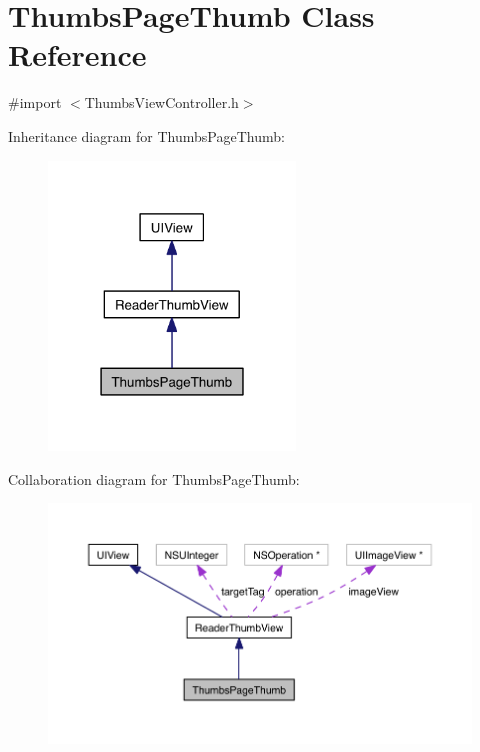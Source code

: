 \hypertarget{interface_thumbs_page_thumb}{\section{Thumbs\-Page\-Thumb Class Reference}
\label{d0/ddf/interface_thumbs_page_thumb}
}


{\ttfamily \#import $<$Thumbs\-View\-Controller.\-h$>$}



Inheritance diagram for Thumbs\-Page\-Thumb\-:
\nopagebreak
\begin{figure}[H]
\begin{center}
\leavevmode
\includegraphics[width=186pt]{d8/d2a/interface_thumbs_page_thumb__inherit__graph}
\end{center}
\end{figure}


Collaboration diagram for Thumbs\-Page\-Thumb\-:
\nopagebreak
\begin{figure}[H]
\begin{center}
\leavevmode
\includegraphics[width=350pt]{de/d8d/interface_thumbs_page_thumb__coll__graph}
\end{center}
\end{figure}
